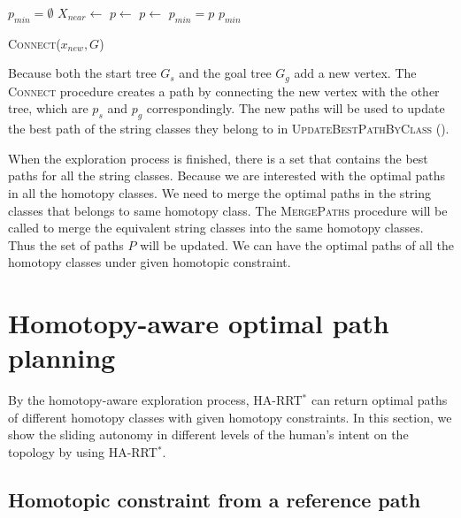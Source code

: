 \documentclass[letterpaper, 10 pt, conference]{ieeeconf}
\begin{document}
\begin{algorithm}[hbtp]
	\begin{algorithmic}[1]
		\State $ p_{min} = \emptyset $
		\State $ X_{near} \leftarrow $ 
					\State $ p \leftarrow $ 
				\Else
				    \State $ p \leftarrow $ 			
				\EndIf
			    	\State $ p_{min} = p $
			    \EndIf 
			\EndIf
		\EndFor
		\Return $ p_{min} $
	\end{algorithmic}
	\caption{ \textsc{Connect}($ x_{new}, G $) }
	\label{alg:harrt:binding}
\end{algorithm}

Because both the start tree $ G_{s} $ and the goal tree $ G_{g} $ add a new vertex. 
The \textsc{Connect} procedure creates a path by connecting the new vertex with the other tree, which are $ p_{s} $ and $ p_{g} $ correspondingly.
The new paths will be used to update the best path of the string classes they belong to in \textsc{UpdateBestPathByClass} ().

When the exploration process is finished, there is a set that contains the best paths for all the string classes.
Because we are interested with the optimal paths in all the homotopy classes.
We need to merge the optimal paths in the string classes that belongs to same homotopy class.
The \textsc{MergePaths} procedure will be called to merge the equivalent string classes into the same homotopy classes. 
Thus the set of paths $ P $ will be updated.
We can have the optimal paths of all the homotopy classes under given homotopic constraint.

\section{Homotopy-aware optimal path planning}
\label{sec:application}

By the homotopy-aware exploration process, HA-RRT$^{*}$ can return optimal paths of different homotopy classes with given homotopy constraints.
In this section, we show the sliding autonomy in different levels of the human's intent on the topology by using HA-RRT$^{*}$.

\subsection{Homotopic constraint from a reference path}
\label{sec:string_constraint}
\end{document}
